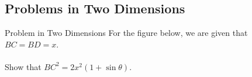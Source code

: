 \subsection{Problems in Two Dimensions}
\begin{wex}{Problem in Two Dimensions}
{For the figure below, we are given that $BC=BD=x$. \\ \\
Show that $BC^2=2x^2(1+\sin\theta)$.\\

}
\end{wex}
